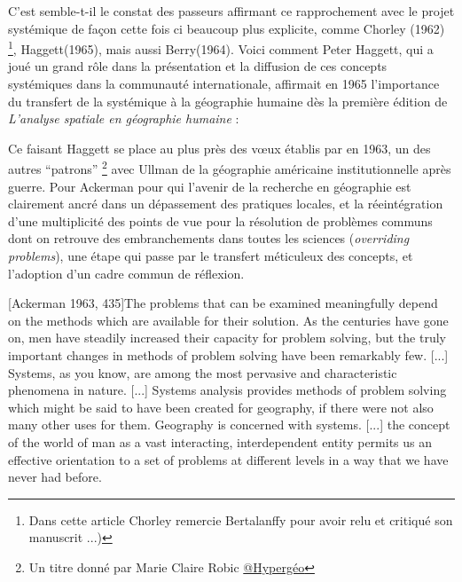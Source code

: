 C'est semble-t-il le constat des passeurs affirmant ce rapprochement avec le projet systémique de façon cette fois ci beaucoup plus explicite, comme Chorley (1962) \footnote{Dans cette article Chorley remercie Bertalanffy pour avoir relu et critiqué son manuscrit ...)}, Haggett(1965), mais aussi Berry(1964). Voici comment Peter Haggett, qui a joué un grand rôle dans la présentation et la diffusion de ces concepts systémiques dans la communauté internationale, affirmait en 1965 l'importance du transfert de la systémique à la géographie humaine dès la première édition de \textit{L’analyse spatiale en géographie humaine} : 

Ce faisant Haggett se place au plus près des vœux établis par \textcite{Ackerman1963} en 1963, un des autres \enquote{patrons} \footnote{Un titre donné par Marie Claire Robic \href{http://www.hypergeo.eu/spip.php?article469}{@Hypergéo}} avec Ullman de la géographie américaine institutionnelle après guerre. Pour Ackerman pour qui l'avenir de la recherche en géographie est clairement ancré dans un dépassement des pratiques locales, et la réeintégration d'une multiplicité des points de vue pour la résolution de problèmes communs dont on retrouve des embranchements dans toutes les sciences (\textit{overriding problems}), une étape qui passe par le transfert méticuleux des concepts, et l'adoption d'un cadre commun de réflexion.

[Ackerman 1963, 435]{The problems that can be examined meaningfully depend on the methods which are available for their solution. As the centuries have gone on, men have steadily increased their capacity for problem solving, but the truly important changes in methods of problem solving have been remarkably few. [...] Systems, as you know, are among the most pervasive and characteristic phenomena in nature. [...] Systems analysis provides methods of problem solving which might be said to have been created for geography, if there were not also many other uses for them. Geography is concerned with systems. [...] the concept of the world of man as a vast interacting, interdependent entity permits us an effective orientation to a set of problems at different levels in a way that we have never had before.}

